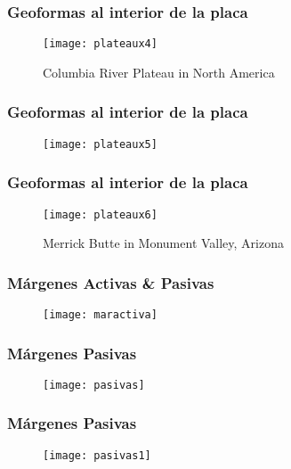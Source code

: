 \documentclass{beamer}
\begin{document}
\begin{frame}
\frametitle{Geoformas al interior de la placa}
\begin{center}
\begin{figure}
\texttt{[image: plateaux4]}
\caption{Columbia River Plateau in North America}
\end{figure}
\end{center}
\end{frame}
\begin{frame}
\frametitle{Geoformas al interior de la placa}
\begin{center}
\begin{figure}
\texttt{[image: plateaux5]}
\end{figure}
\end{center}
\end{frame}
\begin{frame}
\frametitle{Geoformas al interior de la placa}
\begin{center}
\begin{figure}
\texttt{[image: plateaux6]}
\caption{Merrick Butte in Monument Valley, Arizona}
\end{figure}
\end{center}
\end{frame}
\begin{frame}
\frametitle{Márgenes Activas \& Pasivas}
\begin{center}
\begin{figure}
\texttt{[image: maractiva]}
\end{figure}
\end{center}
\end{frame}
\begin{frame}
\frametitle{Márgenes Pasivas}
\begin{center}
\begin{figure}
\texttt{[image: pasivas]}
\end{figure}
\end{center}
\end{frame}
\begin{frame}
\frametitle{Márgenes Pasivas}
\begin{center}
\begin{figure}
\texttt{[image: pasivas1]}
\end{figure}
\end{center}
\end{frame}
\end{document}
